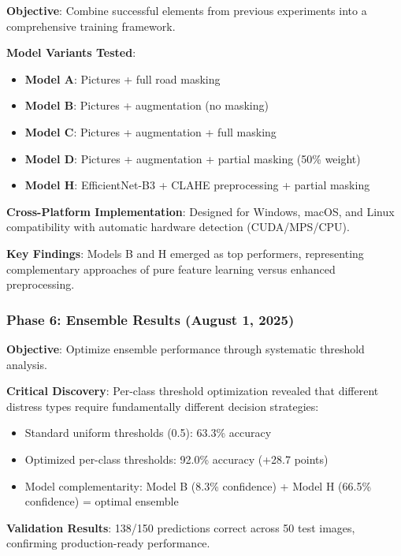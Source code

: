 \documentclass[12pt]{article}
\begin{document}
\textbf{Objective}: Combine successful elements from previous experiments into a comprehensive training framework.

\textbf{Model Variants Tested}:
\begin{itemize}[itemsep=1pt,parsep=0pt,topsep=2pt]
\item \textbf{Model A}: Pictures + full road masking
\item \textbf{Model B}: Pictures + augmentation (no masking)
\item \textbf{Model C}: Pictures + augmentation + full masking
\item \textbf{Model D}: Pictures + augmentation + partial masking (50\% weight)
\item \textbf{Model H}: EfficientNet-B3 + CLAHE preprocessing + partial masking
\end{itemize}

\textbf{Cross-Platform Implementation}: Designed for Windows, macOS, and Linux compatibility with automatic hardware detection (CUDA/MPS/CPU).

\textbf{Key Findings}: Models B and H emerged as top performers, representing complementary approaches of pure feature learning versus enhanced preprocessing.

\subsubsection{Phase 6: Ensemble Results (August 1, 2025)}

\textbf{Objective}: Optimize ensemble performance through systematic threshold analysis.

\textbf{Critical Discovery}: Per-class threshold optimization revealed that different distress types require fundamentally different decision strategies:

\begin{itemize}[itemsep=1pt,parsep=0pt,topsep=2pt]
\item Standard uniform thresholds (0.5): 63.3\% accuracy
\item Optimized per-class thresholds: 92.0\% accuracy (+28.7 points)
\item Model complementarity: Model B (8.3\% confidence) + Model H (66.5\% confidence) = optimal ensemble
\end{itemize}

\textbf{Validation Results}: 138/150 predictions correct across 50 test images, confirming production-ready performance.
\end{document}
